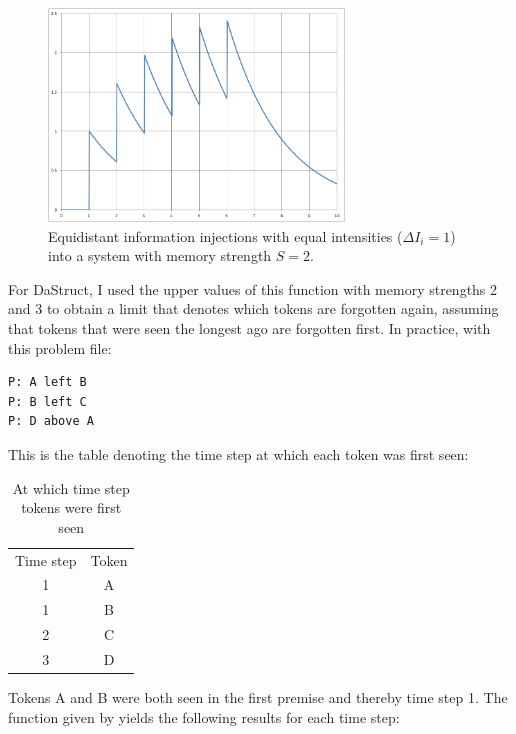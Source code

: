 \documentclass[hidelinks]{scrartcl}
\begin{document}
\begin{figure}[H]
\centering
\includegraphics[width=0.7\textwidth]{Illustrations/Equidistant_equiintense_with_S=2.png}
\caption{Equidistant information injections with equal intensities ($\Delta I_i = 1$) into a system with memory strength $S=2$.}
\label{fig:Equidistant equiintense information injections into a system with memory strength 2}
\end{figure}

For DaStruct, I used the upper values of this function with memory strengths 2 and 3 to obtain a limit that denotes which \gls{token}s are forgotten again, assuming that \gls{token}s that were seen the longest ago are forgotten first. In practice, with this problem file:

\begin{lstlisting}[caption=Premise file, frame=single]
P: A left B
P: B left C
P: D above A
\end{lstlisting}

This is the table denoting the time step at which each \gls{token} was first seen:

\begin{table}[H]
	\begin{tabular}{| c c |}
	\hline
	Time step 	& Token \\
	1			& A		\\
	1			& B		\\
	2			& C		\\
	3			& D		\\
	\hline
	\end{tabular}
	\caption{At which time step tokens were first seen}
\end{table}

Tokens A and B were both seen in the first \gls{premise} and thereby time step 1. The function given by \cite{Yffelti.2016} yields the following results for each time step:
\end{document}
